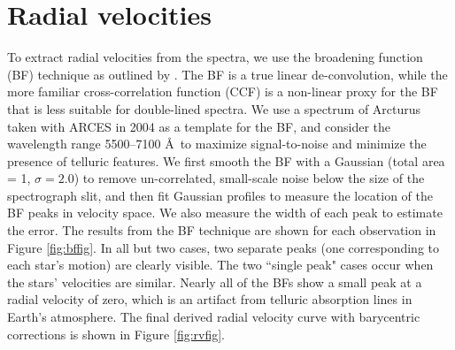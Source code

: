 \section{Radial velocities}\label{rvs}
To extract radial velocities from the spectra, we use the broadening function (BF) technique as outlined by \citet{ruc02}. The BF is a true linear de-convolution, while the more familiar cross-correlation function (CCF) is a non-linear proxy for the BF that is less suitable for double-lined spectra. We use a spectrum of Arcturus taken with ARCES in 2004 as a template for the BF, and consider the wavelength range 5500--7100 \AA \ to maximize signal-to-noise and minimize the presence of telluric features. We first smooth the BF with a Gaussian (total area = 1, $\sigma=2.0$)  to remove un-correlated, small-scale noise below the size of the spectrograph slit, and then fit Gaussian profiles to measure the location of the BF peaks in velocity space. We also measure the width of each peak to estimate the error. The results from the BF technique are shown for each observation in Figure \ref{fig:bffig}. In all but two cases, two separate peaks (one corresponding to each star's motion) are clearly visible. The two ``single peak" cases occur when the stars' velocities are similar. Nearly all of the BFs show a small peak at a radial velocity of zero, which is an artifact from telluric absorption lines in Earth's atmosphere.
The final derived radial velocity curve with barycentric corrections is shown in Figure \ref{fig:rvfig}.


